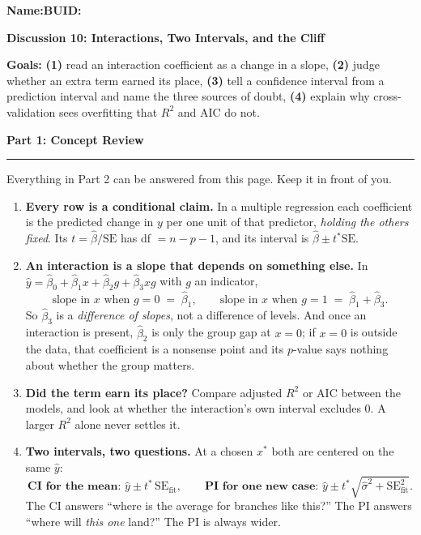 \documentclass[11pt]{article}
\newcommand{\blankline}[1]{\underline{\hspace{#1}}}
\newcommand{\parttitle}[1]{%
  \par\medskip\noindent
  {\large\bfseries #1}\par
  \vspace{-.5em}\noindent\rule{\linewidth}{0.4pt}\par\smallskip}
\begin{document}
\noindent\textbf{Name:}\blankline{2.3in}\hfill\textbf{BUID:}\blankline{1.6in}

\begin{center}
  {\Large\bfseries Discussion 10: Interactions, Two Intervals, and the Cliff}
\end{center}

\noindent\textbf{Goals:} \textbf{(1)} read an interaction coefficient as a change in a slope,
\textbf{(2)} judge whether an extra term earned its place, \textbf{(3)} tell a confidence interval
from a prediction interval and name the three sources of doubt, \textbf{(4)} explain why
cross-validation sees overfitting that $R^2$ and AIC do not.

\parttitle{Part 1: Concept Review}

{\small

\noindent Everything in Part 2 can be answered from this page. Keep it in front of you.

\begin{enumerate}[label=\textbf{\arabic*.}, wide=0pt, itemsep=.4em, topsep=.5em]

\item \textbf{Every row is a conditional claim.} In a multiple regression each coefficient is the
predicted change in $y$ per one unit of that predictor, \emph{holding the others fixed}. Its
$t = \hat\beta/\text{SE}$ has df $= n - p - 1$, and its interval is
$\hat\beta \pm t^{\ast}\text{SE}$.

\item \textbf{An interaction is a slope that depends on something else.} In
$\hat{y} = \hat\beta_0 + \hat\beta_1 x + \hat\beta_2 g + \hat\beta_3 xg$ with $g$ an indicator,
\[
\text{slope in } x \text{ when } g=0 \;=\; \hat\beta_1,
\qquad
\text{slope in } x \text{ when } g=1 \;=\; \hat\beta_1 + \hat\beta_3 .
\]
So $\hat\beta_3$ is a \emph{difference of slopes}, not a difference of levels. And once an
interaction is present, $\hat\beta_2$ is only the group gap at $x = 0$; if $x = 0$ is outside the
data, that coefficient is a nonsense point and its $p$-value says nothing about whether the group
matters.

\item \textbf{Did the term earn its place?} Compare adjusted $R^2$ or AIC between the models, and
look at whether the interaction's own interval excludes $0$. A larger $R^2$ alone never settles it.

\item \textbf{Two intervals, two questions.} At a chosen $x^{\ast}$ both are centered on the same
$\hat{y}$:
\[
\textbf{CI for the mean: } \hat{y} \pm t^{\ast}\,\text{SE}_{\text{fit}},
\qquad
\textbf{PI for one new case: } \hat{y} \pm t^{\ast}\sqrt{\hat\sigma^2 + \text{SE}_{\text{fit}}^2}.
\]
The CI answers ``where is the average for branches like this?'' The PI answers ``where will
\emph{this one} land?'' The PI is always wider.


\end{enumerate}}
\end{document}
